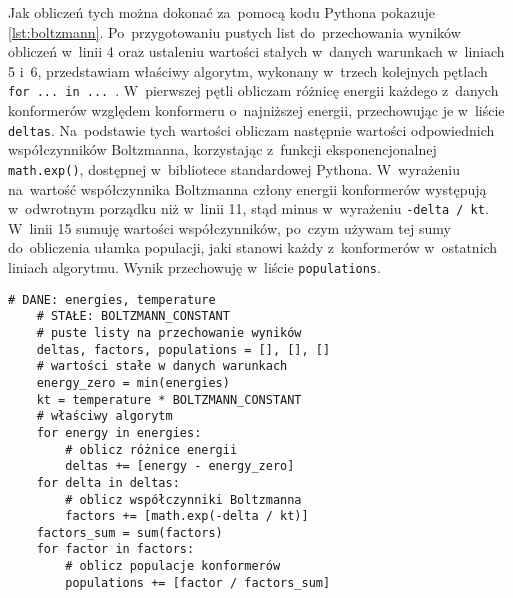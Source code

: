 Jak obliczeń tych można dokonać za~pomocą kodu Pythona pokazuje \cref{lst:boltzmann}.
Po~przygotowaniu pustych list do~przechowania wyników obliczeń w~linii 4 oraz ustaleniu
  wartości stałych w~danych warunkach w~liniach 5 i~6, przedstawiam właściwy algorytm,
  wykonany w~trzech kolejnych pętlach \lstinline|for ... in ...|\ .
W~pierwszej pętli obliczam różnicę energii każdego z~danych konformerów względem konformeru
  o~najniższej energii, przechowując je w~liście \texttt{deltas}.
Na~podstawie tych wartości obliczam następnie wartości odpowiednich współczynników Boltzmanna,
  korzystając z~funkcji eksponencjonalnej \texttt{math.exp()}, dostępnej w~bibliotece
  standardowej Pythona.
W~wyrażeniu na~wartość współczynnika Boltzmanna człony energii konformerów występują
   w~odwrotnym porządku niż w~linii 11, stąd minus w~wyrażeniu \texttt{-delta / kt}.
W~linii 15 sumuję wartości współczynników, po~czym używam tej sumy do~obliczenia ułamka
  populacji, jaki stanowi każdy z~konformerów w~ostatnich liniach algorytmu.
Wynik przechowuję w~liście \texttt{populations}.

\begin{listing}
  \begin{lstlisting}[emph={energies, temperature, BOLTZMANN_CONSTANT}]
    # DANE: energies, temperature
    # STAŁE: BOLTZMANN_CONSTANT
    # puste listy na przechowanie wyników
    deltas, factors, populations = [], [], []
    # wartości stałe w danych warunkach
    energy_zero = min(energies)
    kt = temperature * BOLTZMANN_CONSTANT
    # właściwy algorytm
    for energy in energies:
        # oblicz różnice energii
        deltas += [energy - energy_zero]
    for delta in deltas:
        # oblicz współczynniki Boltzmanna
        factors += [math.exp(-delta / kt)]
    factors_sum = sum(factors)
    for factor in factors:
        # oblicz populacje konformerów
        populations += [factor / factors_sum]
  \end{lstlisting}
  \caption{
    Algorytm obliczania populacji konformerów na~podstawie rozkładu Boltzmanna.
    Po~jego wykonaniu, zmienna \lstinline|populations| zawiera listę ułamkowych wartości populacji
      każdego z~konformerów wziętych pod uwagę, sumujących się do~jedności.
    Algorytm zakłada, że dostarczona zostanie lista wartości energii tych konformerów jako
      zmienna \lstinline|energies| oraz temperatura układu jako zmienna \lstinline|temperature|.
    Zakłada także, że znana wartość stałej Boltzmanna przechowywana jest w~zmiennej
      \lstinline|BOLTZMANN_CONSTANT|.
    Wyrażenie \lstinline|lista += [wartość]| oznacza dodanie danej wartości na~koniec listy.
  }\label{lst:boltzmann}
\end{listing}


